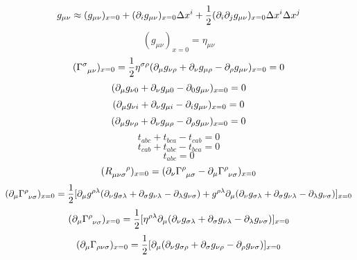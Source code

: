 \begin{equation}
    g_{\mu\nu}\approx (g_{\mu\nu})_{x=0}+(\partial_ig_{\mu\nu})_{x=0}\Delta x^i+\frac{1}{2}(\partial_i\partial_jg_{\mu\nu})_{x=0}\Delta x^i\Delta x^j
\end{equation}
\begin{equation}
    (g_{\mu\nu})_{x=0}=\eta_{{\mu\nu}}
\end{equation}
\begin{equation}
    (\Gamma^{\sigma}_{\ph{\sigma}\mu\nu})_{x=0}=\frac{1}{2}\eta^{{\sigma\rho}}(\p_\mu g_{\nu\rho}+\p_\nu g_{\mu\rho}-\p_\rho g_{\mu\nu})_{x=0}=0
\end{equation}
\begin{equation}
    (\partial_\mu g_{\nu0}+\partial_\nu g_{\mu0}-\partial_0 g_{\mu\nu})_{x=0}=0
\end{equation}
\begin{equation}
    (\partial_\mu g_{\nu i}+\partial_\nu g_{\mu i}-\partial_i g_{\mu\nu})_{x=0}=0
\end{equation}
\begin{equation}
    (\partial_\mu g_{\nu\rho}+\partial_\nu g_{\mu\rho}-\partial_\rho g_{\mu\nu})_{x=0}=0
\end{equation}
\begin{equation}
    t_{abc}+t_{bca}-t_{cab}=0
\end{equation}
\begin{equation}
    t_{cab}+t_{abc}-t_{bca}=0
\end{equation}
\begin{equation}
    t_{abc}=0
\end{equation}
\begin{equation}
    (R_{\mu\nu\sigma}^{\ph{\mu\nu\sigma}\rho})_{x=0}=(\p_\nu\Gamma^{\rho}_{\ph{\rho}\mu\sigma}-\p_\mu\Gamma^{\rho}_{\ph{\rho}\nu\sigma})_{x=0}
\end{equation}
\begin{equation}
    (\p_\mu\Gamma^{\rho}_{\ph{\rho}\nu\sigma})_{x=0}=\frac{1}{2}[\p_\mu g^{{\rho\lambda}}(\p_\nu g_{\sigma\lambda}+\p_\sigma g_{\nu\lambda}-\p_\lambda g_{\nu\sigma})+g^{{\rho\lambda}}\p_\mu(\p_\nu g_{\sigma\lambda}+\p_\sigma g_{\nu\lambda}-\p_\lambda g_{\nu\sigma})]_{x=0}
\end{equation}
\begin{equation}
    (\p_\mu\Gamma^{\rho}_{\ph{\rho}\nu\sigma})_{x=0}=\frac{1}{2}[\eta^{{\rho\lambda}}\p_\mu(\p_\nu g_{\sigma\lambda}+\p_\sigma g_{\nu\lambda}-\p_\lambda g_{\nu\sigma})]_{x=0}
\end{equation}
\begin{equation}
    (\partial_\mu\Gamma_{\rho\nu\sigma})_{x=0}=\frac{1}{2}[\partial_\mu(\partial_\nu g_{\sigma\rho}+\partial_\sigma g_{\nu\rho}-\partial_\rho g_{\nu\sigma})]_{x=0}
\end{equation}
